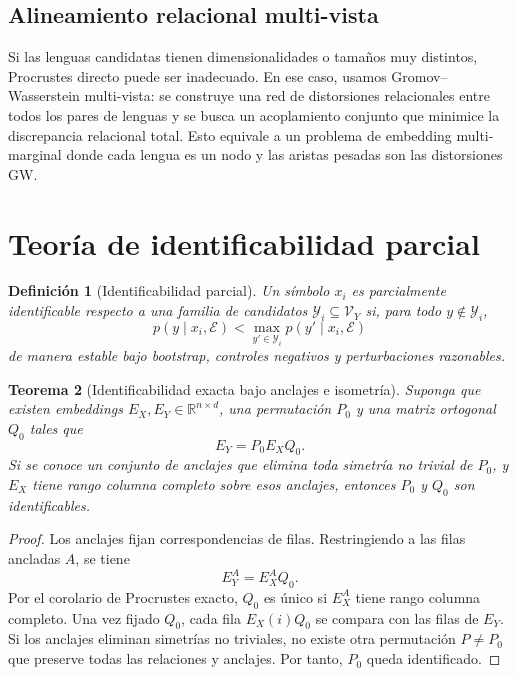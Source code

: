 \documentclass[11pt,a4paper]{article}
\newtheorem{theorem}{Teorema}[section]
\newtheorem{definition}[theorem]{Definición}
\newcommand{\R}{\mathbb{R}}
\newcommand{\1}{\mathbf{1}}
\newcommand{\VY}{\mathcal{V}_Y}
\numberwithin{equation}{section}
\begin{document}
\subsection{Alineamiento relacional multi-vista}

Si las lenguas candidatas tienen dimensionalidades o tamaños muy distintos, Procrustes directo puede ser inadecuado. En ese caso, usamos Gromov--Wasserstein multi-vista: se construye una red de distorsiones relacionales entre todos los pares de lenguas y se busca un acoplamiento conjunto que minimice la discrepancia relacional total. Esto equivale a un problema de embedding multi-marginal donde cada lengua es un nodo y las aristas pesadas son las distorsiones GW.

\section{Teoría de identificabilidad parcial}

\begin{definition}[Identificabilidad parcial]
Un símbolo \(x_i\) es parcialmente identificable respecto a una familia de candidatos \(\mathcal{Y}_i\subseteq\VY\) si, para todo \(y\notin \mathcal{Y}_i\),
\[
    p(y\mid x_i,\mathcal{E})
    <
    \max_{y'\in\mathcal{Y}_i}
    p(y'\mid x_i,\mathcal{E})
\]
de manera estable bajo bootstrap, controles negativos y perturbaciones razonables.
\end{definition}

\begin{theorem}[Identificabilidad exacta bajo anclajes e isometría]
Suponga que existen embeddings \(E_X,E_Y\in\R^{n\times d}\), una permutación \(P_0\) y una matriz ortogonal \(Q_0\) tales que
\[
    E_Y=P_0E_XQ_0.
\]
Si se conoce un conjunto de anclajes que elimina toda simetría no trivial de \(P_0\), y \(E_X\) tiene rango columna completo sobre esos anclajes, entonces \(P_0\) y \(Q_0\) son identificables.
\end{theorem}

\begin{proof}
Los anclajes fijan correspondencias de filas. Restringiendo a las filas ancladas \(A\), se tiene
\[
    E_Y^A=E_X^AQ_0.
\]
Por el corolario de Procrustes exacto, \(Q_0\) es único si \(E_X^A\) tiene rango columna completo. Una vez fijado \(Q_0\), cada fila \(E_X(i)Q_0\) se compara con las filas de \(E_Y\). Si los anclajes eliminan simetrías no triviales, no existe otra permutación \(P\neq P_0\) que preserve todas las relaciones y anclajes. Por tanto, \(P_0\) queda identificado.
\end{proof}
\end{document}
